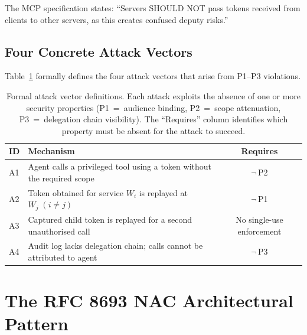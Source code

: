 \documentclass[journal]{IEEEtran}
\theoremstyle{definition}
\begin{document}
The MCP specification \cite{mcp_security} states: ``Servers SHOULD NOT pass
tokens received from clients to other servers, as this creates confused deputy
risks.''

\subsection{Four Concrete Attack Vectors}

Table~\ref{tab:attack_formal} formally defines the four attack vectors that arise from P1--P3 violations.

\begin{table}[h]
\caption{Formal attack vector definitions. Each attack exploits the absence of
one or more security properties (P1~=~audience binding, P2~=~scope attenuation,
P3~=~delegation chain visibility). The ``Requires'' column identifies which
property must be absent for the attack to succeed.}
\label{tab:attack_formal}
\centering
\footnotesize
\setlength{\tabcolsep}{3pt}
\begin{tabularx}{\columnwidth}{l X c}
\toprule
\textbf{ID} & \textbf{Mechanism} & \textbf{Requires} \\
\midrule
A1 & Agent calls a privileged tool using a token without the required scope
     & $\neg$\,P2 \\
A2 & Token obtained for service $W_i$ is replayed at $W_j\;(i\neq j)$
     & $\neg$\,P1 \\
A3 & Captured child token is replayed for a second unauthorised call
     & No single-use enforcement \\
A4 & Audit log lacks delegation chain; calls cannot be attributed to agent
     & $\neg$\,P3 \\
\bottomrule
\end{tabularx}
\end{table}


\section{The RFC 8693 NAC Architectural Pattern}
\label{sec:solution}
\end{document}
